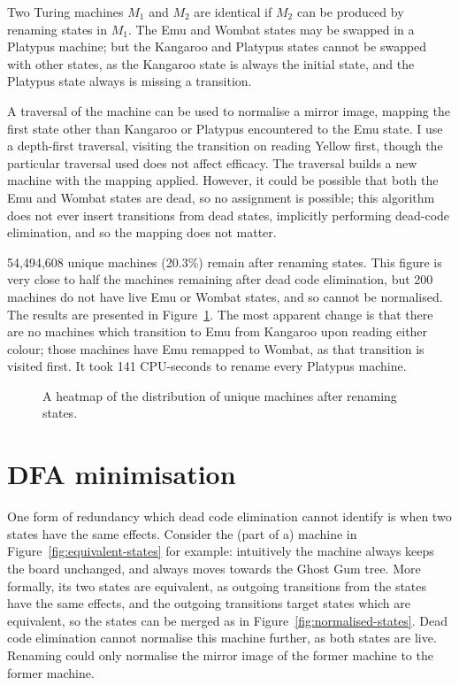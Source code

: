 Two Turing machines $M_1$ and $M_2$ are identical if $M_2$
can be produced by renaming states in $M_1$. The Emu
and Wombat states may be swapped in a Platypus machine; but the
Kangaroo and Platypus states cannot be swapped with other states,
as the Kangaroo state is always the initial state, and the Platypus
state always is missing a transition.

A traversal of the machine can be used to normalise a mirror image,
mapping the first state other than Kangaroo or Platypus encountered
to the Emu state. I use a depth-first traversal, visiting the transition
on reading Yellow first, though the particular traversal used does not
affect efficacy. The traversal builds a new machine with the mapping
applied. However, it could be possible that both the Emu and Wombat
states are dead, so no assignment is possible; this algorithm does
not ever insert transitions from dead states, implicitly performing
dead-code elimination, and so the mapping does not matter.

54,494,608 unique machines (20.3\%) remain after renaming states.
This figure is very close to half the machines remaining after
dead code elimination, but 200 machines do not have live Emu or
Wombat states, and so cannot be normalised. The results are
presented in Figure~\ref{fig:rename}. The most apparent change is
that there are no machines which transition to Emu from
Kangaroo upon reading either colour; those machines have Emu
remapped to Wombat, as that transition is visited first.
It took 141 CPU-seconds to rename every Platypus machine.

\begin{figure}
  \begin{center}
    
  \end{center}
  \caption{A heatmap of the distribution of unique machines after renaming states.}
  \label{fig:rename}
\end{figure}

\section{DFA minimisation}

One form of redundancy which dead code elimination cannot identify
is when two states have the same effects. Consider the
(part of a) machine in Figure~\ref{fig:equivalent-states} for example:
intuitively the machine always keeps the board unchanged, and
always moves towards the Ghost Gum tree. More formally, its two states
are equivalent, as outgoing transitions from the states have the same effects,
and the outgoing transitions target states which are equivalent, so
the states can be merged as in Figure~\ref{fig:normalised-states}. Dead
code elimination cannot normalise this machine further, as both states
are live. Renaming could only normalise the mirror image of the former
machine to the former machine.

